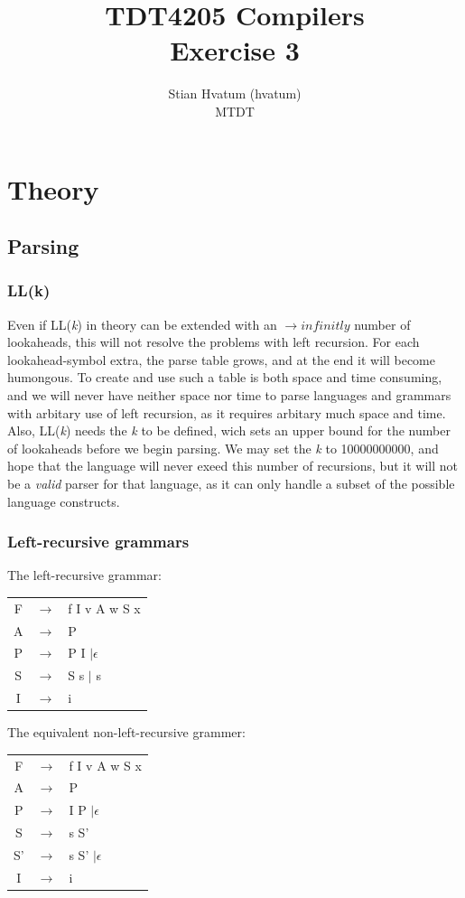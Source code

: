 \documentclass{article}
\title{TDT4205 Compilers\\
\Huge Exercise 3}
\author{Stian Hvatum (hvatum)\\MTDT}
\begin{document}
\maketitle

\section{Theory}
\subsection{Parsing}
\subsubsection{LL(k)}
Even if LL(\textit{k}) in theory can be extended with an $\rightarrow infinitly$
number of lookaheads, this will not resolve the problems with left recursion. For each
lookahead-symbol extra, the parse table grows, and at the end it will become
humongous. To create and use such a table is both space and time consuming, and
we will never have neither space nor time to parse languages and grammars with arbitary use of left
recursion, as it requires arbitary much space and time. Also, LL(\textit{k}) needs the
\textit{k} to be defined, wich sets an upper bound for the number of lookaheads
before we begin parsing. We may set the \textit{k} to 10000000000, and hope that
the language will never exeed this number of recursions, but it will not be a
\emph{valid} parser for that language, as it can only handle a subset of the
possible language constructs.

\subsubsection{Left-recursive grammars}
The left-recursive grammar:\\
\begin{tabular}{ccl}
F & $\rightarrow$ & f I v A w S x \\ 
A & $\rightarrow$ & P \\
P & $\rightarrow$ & P I $| \epsilon$\\ 
S & $\rightarrow$ & S s $|$ s\\
I & $\rightarrow$ & i\\
\end{tabular}


The equivalent non-left-recursive grammer:\\
\begin{tabular}{ccl}
F & $\rightarrow$ & f I v A w S x \\ 
A & $\rightarrow$ & P \\
P & $\rightarrow$ & I P $| \epsilon$\\ 
S & $\rightarrow$ & s S'\\
S' & $\rightarrow$ & s S' $| \epsilon$\\
I & $\rightarrow$ & i\\
\end{tabular}
\end{document}
